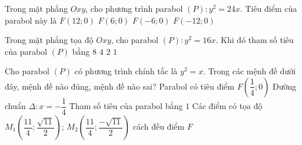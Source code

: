 

\begin{ex}%
	Trong mặt phẳng $Oxy$, cho phương trình parabol $(P)  \colon y^2=24x$. Tiêu điểm của parabol này là
	\choice 
		{$F(12;0)$} 
		{\True  $F(6;0)$}
		 {$F(-6;0)$}
		 {$F(-12;0)$}
\end{ex}

\begin{ex}%
	Trong mặt phẳng tọa độ $Oxy$, cho parabol $(P)\colon y^2=16 x$. Khi đó tham  số tiêu của parabol $(P)$ bằng
	 \choice
		{\True  $8$}
		 {$4$}
		{$2$} 
		{$1$} 
\end{ex}



\begin{ex}%
	Cho parabol $(P)$ có phương trình chính tắc là $y^2=x$. Trong các mệnh đề dưới đây, mệnh  đề nào đúng, mệnh đề nào sai?
	 \choiceTF
		{\True Parabol có  tiêu điểm $F\left(\dfrac{1}{4};0\right)$}
		{\True Đường  chuẩn $\Delta \colon x=-\dfrac{1}{4}$}
		{Tham số tiêu của parabol  bằng $1$}
		{\True Các điểm có tọa độ $M_1\left(\dfrac{11}{4};\dfrac{\sqrt{11}}{2}\right)$; $M_2\left(\dfrac{11}{4};\dfrac{-\sqrt{11}}{2}\right)$ cách  đều điểm $F$}
\end{ex}

